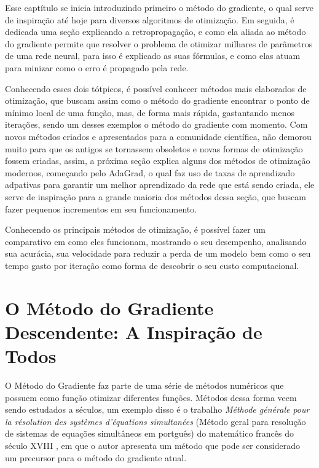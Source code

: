 Esse captítulo se inicia introduzindo primeiro o método do gradiente, o qual serve de inspiração até hoje para diversos algoritmos de otimização. Em seguida, é dedicada uma seção explicando a retropropagação, e como ela aliada ao método do gradiente permite que resolver o problema de otimizar milhares de parâmetros de uma rede neural, para isso é explicado as suas fórmulas, e como elas atuam para minizar como o erro é propagado pela rede. 

Conhecendo esses dois tótpicos, é possível conhecer métodos mais elaborados de otimização, que buscam assim como o método do gradiente encontrar o ponto de mínimo local de uma função, mas, de forma mais rápida, gastantando menos iterações, sendo um desses exemplos o método do gradiente com momento. Com novos métodos criados e apresentados para a comunidade científica, não demorou muito para que os antigos se tornassem obsoletos e novas formas de otimização fossem criadas, assim, a próxima seção explica alguns dos métodos de otimização modernos, começando pelo AdaGrad, o qual faz uso de taxas de aprendizado adpativas para garantir um melhor aprendizado da rede que está sendo criada, ele serve de inspiração para a grande maioria dos métodos dessa seção, que buscam fazer pequenos incrementos em seu funcionamento.

Conhecendo os principais métodos de otimização, é possível fazer um comparativo em como eles funcionam, mostrando o seu desempenho, analisando sua acurácia, sua velocidade para reduzir a perda de um modelo bem como o seu tempo gasto por iteração como forma de descobrir o seu custo computacional.


\section{O Método do Gradiente Descendente: A Inspiração de Todos}

O Método do Gradiente faz parte de uma série de métodos numéricos que possuem como função otimizar diferentes funções. Métodos dessa forma veem sendo estudados a séculos, um exemplo disso é o trabalho \textit{M{\'e}thode g{\'e}n{\'e}rale pour la r{\'e}solution des syst{\`e}mes d'{\'e}quations simultan{\'e}es} (Método geral para resolução de sistemas de equações simultâneos em portguês) do matemático francês do século XVIII \textcite{CauchyMetodoDoGradiente}, em que o autor apresenta um método que pode ser considerado um precursor para o método do gradiente atual.

